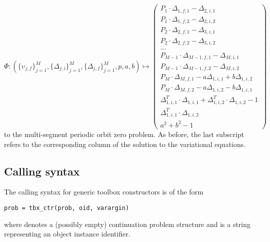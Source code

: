 \begin{equation}
\Phi:\left(\{\upsilon_{j,f}\}_{j=1}^M,\{\Delta_{j,i}\}_{j=1}^M,\{\Delta_{j,f}\}_{j=1}^M,p,a,b\right)\mapsto\left(\begin{array}{c}P_1\cdot\Delta_{1,f,1}-\Delta_{2,i,1}\\P_1\cdot\Delta_{1,f,2}-\Delta_{2,i,2}\\P_2\cdot\Delta_{2,f,1}-\Delta_{3,i,1}\\P_2\cdot\Delta_{2,f,2}-\Delta_{3,i,2}\\\ldots\\P_{M-1}\cdot\Delta_{M-1,f,1}-\Delta_{M,i,1}\\P_{M-1}\cdot\Delta_{M-1,f,2}-\Delta_{M,i,2}\\P_M\cdot\Delta_{M,f,1}-a\Delta_{1,i,1}+b\Delta_{1,i,2}\\P_M\cdot\Delta_{M,f,2}-a\Delta_{1,i,2}-b\Delta_{1,i,1}\\\Delta_{1,i,1}^T\cdot\Delta_{1,i,1}+\Delta_{1,i,2}^T\cdot\Delta_{1,i,2}-1\\\Delta_{1,i,1}^T\cdot\Delta_{1,i,2}\\a^2+b^2-1\end{array}\right)
\end{equation}
to the multi-segment periodic orbit zero problem. As before, the last subscript refers to the corresponding column of the solution to the variational equations.


\subsection{Calling syntax}
The calling syntax for generic  toolbox constructors is of the form
\begin{lstlisting}[language=coco-highlight]
prob = tbx_ctr(prob, oid, varargin)
\end{lstlisting}
where  denotes a (possibly empty) continuation problem structure and  is a string representing an object instance identifier.

